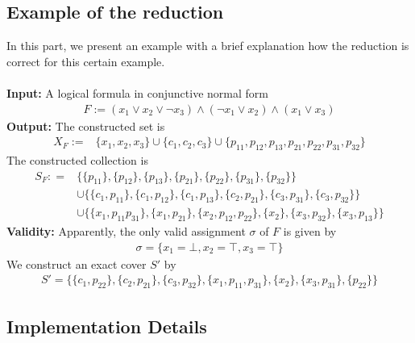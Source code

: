 \subsection{Example of the reduction}
In this part, we present an example with a brief explanation how the reduction is correct for 
this certain example.\\\\
\textbf{Input:} A logical formula in conjunctive normal form 
\begin{align*}
    F := (x_1 \lor x_2 \lor \neg x_3) \land (\neg x_1 \lor x_2) \land (x_1 \lor x_3)
\end{align*}
\textbf{Output:}
The constructed set is
\begin{align*}
    X_F := & \{ x_1 ,x_2, x_3\} \cup \{c_1, c_2, c_3\} \cup 
    \{p_{11}, p_{12}, p_{13}, p_{21}, p_{22}, p_{31}, p_{32}\}
\end{align*}
The constructed collection is 
\begin{align*}
    S_F : = & \{\{p_{11}\}, \{p_{12}\}, \{p_{13}\}, \{p_{21}\}, \{p_{22}\}, \{p_{31}\}, \{p_{32}\}\} \\
      & \cup  \{\{c_1, p_{11}\}, \{c_1, p_{12}\}, \{c_1, p_{13}\}, \{c_2, p_{21}\}, 
      \{c_3, p_{31}\}, \{c_3, p_{32}\}\} \\ 
      & \cup \{\{x_1, p_{11} p_{31}\}, \{x_1, p_{21}\}, \{x_2, p_{12}, p_{22}\}, \{x_2\},
      \{x_3, p_{32}\}, \{x_3, p_{13}\}\}
\end{align*}
\textbf{Validity:} Apparently, the only valid assignment $\sigma$ of $F$ is given by 
\begin{align*}
    \sigma = \{x_1 = \bot, x_2 = \top, x_3 = \top \}
\end{align*}
We construct an exact cover $S'$ by 
\begin{align*}
    S' = \{\{c_1, p_{22}\}, \{c_2, p_{21}\}, \{c_3, p_{32}\},
    \{x_1, p_{11}, p_{31}\}, \{x_2\}, \{x_3, p_{31}\},
    \{p_{22}\}\}
\end{align*}

\subsection{Implementation Details}
\label{sec:sat-imp}
